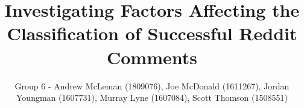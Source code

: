 \documentclass{template}
\begin{document}

\title{\huge{Investigating Factors Affecting the Classification of Successful Reddit Comments}}
\author{Group 6 - Andrew McLeman (1809076), Joe McDonald (1611267), Jordan Youngman (1607731), Murray Lyne (1607084), Scott Thomson (1508551)}











\footnotesize  %


\normalsize
\appendix


\end{document}
